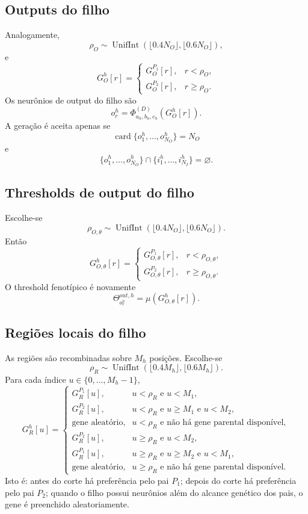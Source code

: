 \documentclass[12pt,a4paper,fleqn]{article}
\newcommand{\UnifInt}{\operatorname{UnifInt}}
\newcommand{\card}{\operatorname{card}}
\begin{document}
\subsection{Outputs do filho}

Analogamente,
$$
	\rho_O\sim\UnifInt(\lfloor0.4N_O\rfloor,\lfloor0.6N_O\rfloor),
$$
e
$$
	G_O^h[r]=
	\begin{cases}
		G_O^{P_1}[r], & r<\rho_O,\\
		G_O^{P_2}[r], & r\geq\rho_O.
	\end{cases}
$$
Os neurônios de output do filho são
$$
	o_r^h=\Phi_{a_h,b_h,c_h}^{(D)}(G_O^h[r]).
$$
A geração é aceita apenas se
$$
	\card\{o_1^h,\ldots,o_{N_O}^h\}=N_O
$$
e
$$
	\{o_1^h,\ldots,o_{N_O}^h\}\cap\{i_1^h,\ldots,i_{N_I}^h\}=\varnothing.
$$

\subsection{Thresholds de output do filho}

Escolhe-se
$$
	\rho_{O,\theta}\sim\UnifInt(\lfloor0.4N_O\rfloor,\lfloor0.6N_O\rfloor).
$$
Então
$$
	G_{O,\theta}^h[r]=
	\begin{cases}
		G_{O,\theta}^{P_1}[r], & r<\rho_{O,\theta},\\
		G_{O,\theta}^{P_2}[r], & r\geq\rho_{O,\theta}.
	\end{cases}
$$
O threshold fenotípico é novamente
$$
	\Theta_{o_r^h}^{out,h}=\mu(G_{O,\theta}^h[r]).
$$

\subsection{Regiões locais do filho}

As regiões são recombinadas sobre $M_h$ posições. Escolhe-se
$$
	\rho_R\sim\UnifInt(\lfloor0.4M_h\rfloor,\lfloor0.6M_h\rfloor).
$$
Para cada índice $u\in\{0,\ldots,M_h-1\}$,
$$
	G_R^h[u]=
	\begin{cases}
		G_R^{P_1}[u], & u<\rho_R\text{ e }u<M_1,\\
		G_R^{P_2}[u], & u<\rho_R\text{ e }u\geq M_1\text{ e }u<M_2,\\
		\text{gene aleatório}, & u<\rho_R\text{ e não há gene parental disponível},\\
		G_R^{P_2}[u], & u\geq\rho_R\text{ e }u<M_2,\\
		G_R^{P_1}[u], & u\geq\rho_R\text{ e }u\geq M_2\text{ e }u<M_1,\\
		\text{gene aleatório}, & u\geq\rho_R\text{ e não há gene parental disponível}.
	\end{cases}
$$
Isto é: antes do corte há preferência pelo pai $P_1$; depois do corte há preferência pelo pai $P_2$; quando o filho possui neurônios além do alcance genético dos pais, o gene é preenchido aleatoriamente.
\end{document}
